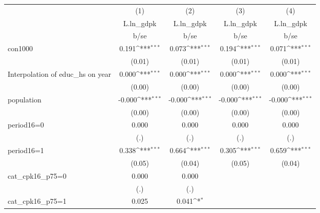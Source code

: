 {
\def\sym#1{\ifmmode^{#1}\else\(^{#1}\)\fi}
\begin{tabular}{l*{4}{c}}
\hline\hline
                    &\multicolumn{1}{c}{(1)}&\multicolumn{1}{c}{(2)}&\multicolumn{1}{c}{(3)}&\multicolumn{1}{c}{(4)}\\
                    &\multicolumn{1}{c}{L.ln\_gdpk}&\multicolumn{1}{c}{L.ln\_gdpk}&\multicolumn{1}{c}{L.ln\_gdpk}&\multicolumn{1}{c}{L.ln\_gdpk}\\
                    &        b/se         &        b/se         &        b/se         &        b/se         \\
\hline
con1000             &       0.191\sym{***}&       0.073\sym{***}&       0.194\sym{***}&       0.071\sym{***}\\
                    &      (0.01)         &      (0.01)         &      (0.01)         &      (0.01)         \\
Interpolation of educ\_hs on year&       0.000\sym{***}&       0.000\sym{***}&       0.000\sym{***}&       0.000\sym{***}\\
                    &      (0.00)         &      (0.00)         &      (0.00)         &      (0.00)         \\
population          &      -0.000\sym{***}&      -0.000\sym{***}&      -0.000\sym{***}&      -0.000\sym{***}\\
                    &      (0.00)         &      (0.00)         &      (0.00)         &      (0.00)         \\
period16=0          &       0.000         &       0.000         &       0.000         &       0.000         \\
                    &         (.)         &         (.)         &         (.)         &         (.)         \\
period16=1          &       0.338\sym{***}&       0.664\sym{***}&       0.305\sym{***}&       0.659\sym{***}\\
                    &      (0.05)         &      (0.04)         &      (0.05)         &      (0.04)         \\
cat\_cpk16\_p75=0     &       0.000         &       0.000         &                     &                     \\
                    &         (.)         &         (.)         &                     &                     \\
cat\_cpk16\_p75=1     &       0.025         &       0.041\sym{*}  &                     &                     \\

\end{tabular}}
